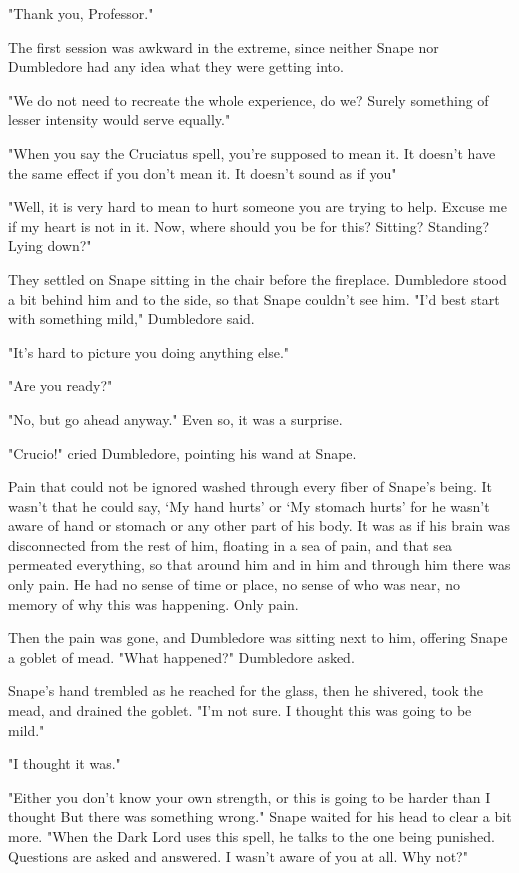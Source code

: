 "Thank you, Professor."

The first session was awkward in the extreme, since neither Snape nor Dumbledore had any idea what they were getting into.

"We do not need to recreate the whole experience, do we? Surely something of lesser intensity would serve equally."

"When you say the Cruciatus spell, you're supposed to mean it. It doesn't have the same effect if you don't mean it. It doesn't sound as if you{\el}"

"Well, it is very hard to mean to hurt someone you are trying to help. Excuse me if my heart is not in it. Now, where should you be for this? Sitting? Standing? Lying down?"

They settled on Snape sitting in the chair before the fireplace. Dumbledore stood a bit behind him and to the side, so that Snape couldn't see him. "I'd best start with something mild," Dumbledore said.

"It's hard to picture you doing anything else."

"Are you ready?"

"No, but go ahead anyway." Even so, it was a surprise.

"Crucio!" cried Dumbledore, pointing his wand at Snape.

Pain that could not be ignored washed through every fiber of Snape's being. It wasn't that he could say, `My hand hurts' or `My stomach hurts' for he wasn't aware of hand or stomach or any other part of his body. It was as if his brain was disconnected from the rest of him, floating in a sea of pain, and that sea permeated everything, so that around him and in him and through him there was only pain. He had no sense of time or place, no sense of who was near, no memory of why this was happening. Only pain.

Then the pain was gone, and Dumbledore was sitting next to him, offering Snape a goblet of mead. "What happened?" Dumbledore asked.

Snape's hand trembled as he reached for the glass, then he shivered, took the mead, and drained the goblet. "I'm not sure. I thought this was going to be mild."

"I thought it was."

"Either you don't know your own strength, or this is going to be harder than I thought{\el} But there was something wrong." Snape waited for his head to clear a bit more. "When the Dark Lord uses this spell, he talks to the one being punished. Questions are asked and answered. I wasn't aware of you at all. Why not?"

